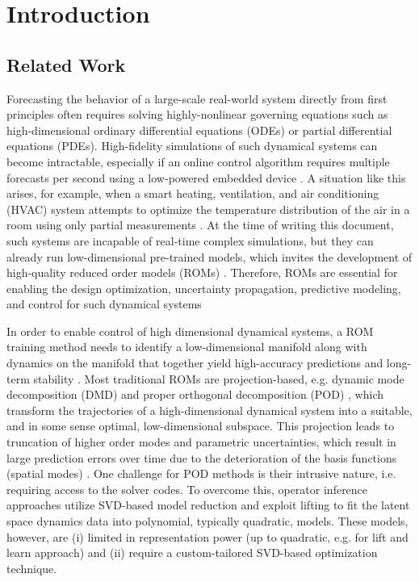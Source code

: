 
\section{Introduction}
\subsection{Related Work}
        Forecasting the behavior of a large-scale real-world system directly from first principles often requires solving highly-nonlinear governing equations such as high-dimensional ordinary differential equations (ODEs) or partial differential equations (PDEs). 
        High-fidelity simulations of such dynamical systems can become intractable, especially if an online control algorithm requires multiple forecasts per second using a low-powered embedded device \citep{rowley2017model,lucia2004reduced,benner2015survey}. A situation like this arises, for example, when a smart heating, ventilation, and air conditioning (HVAC) system attempts to optimize the temperature distribution of the air in a room using only partial measurements \citep{farahmand2016learning,nabi2022robust}. At the time of writing this document, such systems are incapable of real-time complex simulations, but they can already run low-dimensional pre-trained models, which invites the development of high-quality reduced order models (ROMs) \citep{otterness2017evaluation}. Therefore, ROMs are essential for enabling the design optimization, uncertainty propagation, predictive modeling, and control for such dynamical systems \citep{brunton2022data,kutz2016dynamic,rowley2017model,jones2020characterising}
        
        In order to enable control of high dimensional dynamical systems, a ROM training method needs to  identify a low-dimensional manifold along with dynamics on the manifold that together yield high-accuracy predictions and long-term stability \citep{ahmed2021closures,noack2011reduced}. Most traditional ROMs are projection-based, e.g. dynamic mode decomposition (DMD) \citep{kutz2016dynamic,tu2013dynamic} and proper orthogonal decomposition (POD) \citep{holmes2012turbulence}, which transform the trajectories of a high-dimensional dynamical system into a suitable, and in some sense optimal, low-dimensional subspace. This projection leads to truncation of higher order modes and parametric uncertainties, which result in large prediction errors over time due to the deterioration of the basis functions (spatial modes) \citep{benner2015survey}. One challenge for POD methods is their intrusive nature, i.e. requiring access to the solver codes. To overcome this, operator inference approaches \citep{qian2020lift,peherstorfer2016data} utilize SVD-based model reduction and  exploit lifting to fit the latent space dynamics data into polynomial, typically quadratic, models. These models, however, are (i) limited in representation power (up to quadratic, e.g. for lift and learn approach) and (ii) require a custom-tailored SVD-based optimization technique. 
        
